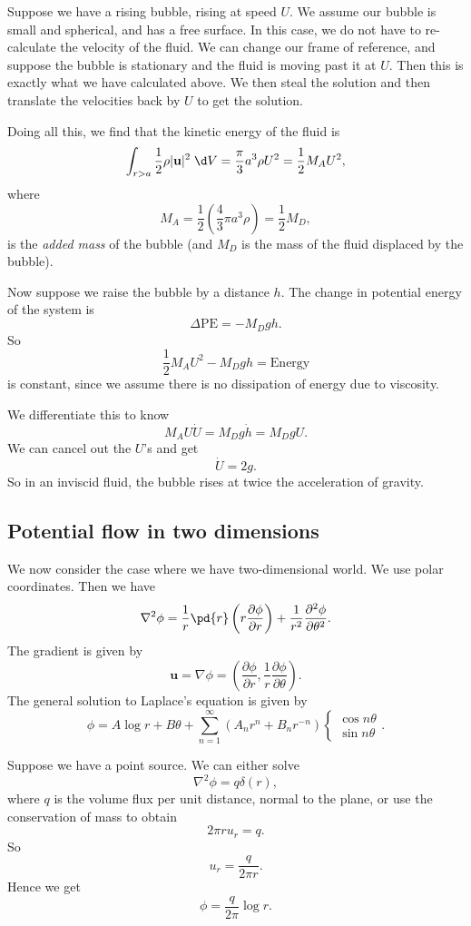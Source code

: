 \documentclass[a4paper]{article}
\begin{document}
\begin{eg}
  Suppose we have a rising bubble, rising at speed $U$. We assume our bubble is small and spherical, and has a free surface. In this case, we do not have to re-calculate the velocity of the fluid. We can change our frame of reference, and suppose the bubble is stationary and the fluid is moving past it at $U$. Then this is exactly what we have calculated above. We then steal the solution and then translate the velocities back by $U$ to get the solution.

  Doing all this, we find that the kinetic energy of the fluid is
  \[
    \int_{r > a} \frac{1}{2}\rho |\mathbf{u}|^2 \;\d V = \frac{\pi}{3} a^3 \rho U^2 = \frac{1}{2}M_A U^2,
  \]
  where
  \[
    M_A = \frac{1}{2} \left(\frac{4}{3} \pi a^3 \rho\right) = \frac{1}{2} M_D,
  \]
  is the \emph{added mass} of the bubble (and $M_D$ is the mass of the fluid displaced by the bubble).

  Now suppose we raise the bubble by a distance $h$. The change in potential energy of the system is
  \[
    \Delta\mathrm{PE} = -M_D gh.
  \]
  So
  \[
    \frac{1}{2} M_A U^2 - M_D gh = \mathrm{Energy}
  \]
  is constant, since we assume there is no dissipation of energy due to viscosity.

  We differentiate this to know
  \[
    M_A U \dot{U} = M_D g \dot{h} = M_D gU.
  \]
  We can cancel out the $U$'s and get
  \[
    \dot{U} = 2g.
  \]
  So in an inviscid fluid, the bubble rises at twice the acceleration of gravity.
\end{eg}

\subsection{Potential flow in two dimensions}
We now consider the case where we have two-dimensional world. We use polar coordinates. Then we have
\[
  \nabla^2 \phi = \frac{1}{r} \pd{r} \left(r \frac{\partial \phi}{\partial r}\right) + \frac{1}{r^2} \frac{\partial^2 \phi}{\partial \theta^2}.
\]
The gradient is given by
\[
  \mathbf{u} = \nabla \phi = \left(\frac{\partial \phi}{\partial r}, \frac{1}{r} \frac{\partial \phi}{\partial \theta}\right).
\]
The general solution to Laplace's equation is given by
\[
  \phi = A \log r + B \theta + \sum_{n = 1}^\infty (A_n r^n + B_n r^{-n})
  \begin{cases}
    \cos n\theta\\
    \sin n\theta
  \end{cases}.
\]
\begin{eg}
  Suppose we have a point source. We can either solve
  \[
    \nabla^2 \phi = q \delta (r),
  \]
  where $q$ is the volume flux per unit distance, normal to the plane, or use the conservation of mass to obtain
  \[
    2\pi r u_r = q.
  \]
  So
  \[
    u_r = \frac{q}{2\pi r}.
  \]
  Hence we get
  \[
    \phi = \frac{q}{2\pi} \log r.
  \]
\end{eg}
\end{document}
